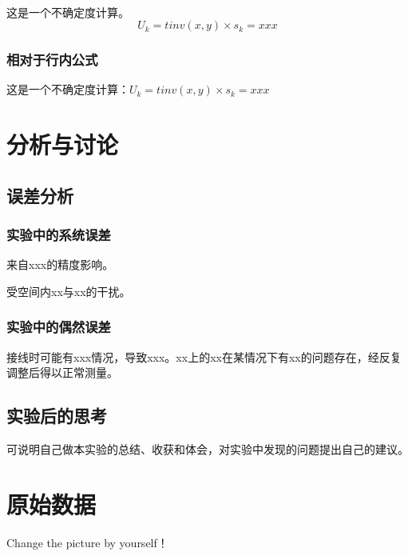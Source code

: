 \documentclass[UTF8]{ctexart}
\begin{document}
\paragraph{}这是一个不确定度计算。
\[
U_k=tinv(x,y)×s_k=xxx
\]
\subsubsection{相对于行内公式}
这是一个不确定度计算：$U_k=tinv(x,y)×s_k=xxx$


\section{分析与讨论}

\subsection{误差分析}

\subsubsection{实验中的系统误差}
来自xxx的精度影响。

受空间内xx与xx的干扰。

\subsubsection{实验中的偶然误差}
接线时可能有xxx情况，导致xxx。xx上的xx在某情况下有xx的问题存在，经反复调整后得以正常测量。

\subsection{实验后的思考}
可说明自己做本实验的总结、收获和体会，对实验中发现的问题提出自己的建议。

\newpage
\section{原始数据}
\begin{center}
    Change the picture by yourself！
    
    
\end{center}




\end{document}
